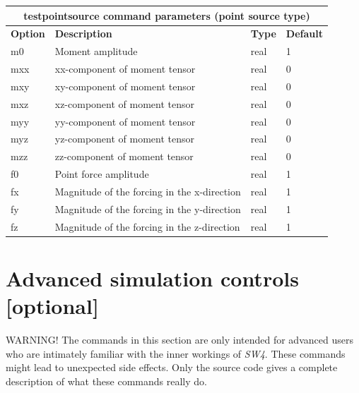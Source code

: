 \documentclass[11pt]{report}
\begin{document}
\begin{center}
\begin{tabular}{|l|p{8cm}|l|l|} \hline
\multicolumn{4}{|c|}{\bf testpointsource command parameters (point source type)}\\ \hline
\bf{Option} & \bf{Description} & \bf{Type} & \bf{Default} \\ \hline \hline
m0   & Moment amplitude & real & 1 \\ \hline
mxx  & xx-component of moment tensor & real & 0 \\ \hline
mxy  & xy-component of moment tensor & real & 0 \\ \hline
mxz  & xz-component of moment tensor & real & 0 \\ \hline
myy  & yy-component of moment tensor & real & 0 \\ \hline
myz  & yz-component of moment tensor & real & 0 \\ \hline
mzz  & zz-component of moment tensor & real & 0 \\ \hline
\hline
f0   & Point force amplitude                       & real & 1\\ \hline 
fx   & Magnitude of the forcing in the x-direction & real & 1 \\ \hline
fy   & Magnitude of the forcing in the y-direction & real & 1 \\ \hline
fz   & Magnitude of the forcing in the z-direction & real & 1 \\ \hline
\end{tabular}
\end{center}

\section{Advanced simulation controls [optional]}

WARNING! The commands in this section are only intended for advanced users who are intimately
familiar with the inner workings of \emph{SW4}. These commands might lead to unexpected side
effects. Only the source code gives a complete description of what these commands really do.
\end{document}
